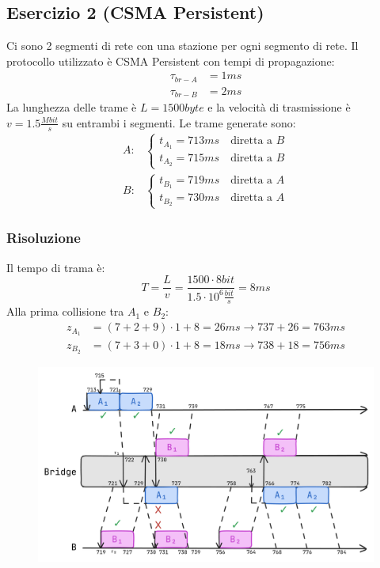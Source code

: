 \documentclass[a4paper]{article}
\begin{document}
\subsection{Esercizio 2 (CSMA Persistent)}
Ci sono 2 segmenti di rete con una stazione per ogni segmento di rete. Il protocollo
utilizzato è CSMA Persistent con tempi di propagazione:
\[
\begin{aligned}
  \tau_{br-A} &= 1ms \\
  \tau_{br-B} &= 2ms
\end{aligned}
\] 
La lunghezza delle trame è \( L = 1500 byte\) e la velocità di trasmissione è
\( v = 1.5 \frac{Mbit}{s} \) su entrambi i segmenti. Le trame generate sono:
\[
\begin{aligned}
  A: & \begin{cases}
    t_{A_1} = 713ms \quad \text{diretta a }B\\
    t_{A_2} = 715ms \quad \text{diretta a }B
  \end{cases}\\
    B: & \begin{cases}
      t_{B_1} = 719ms \quad \text{diretta a }A\\
      t_{B_2} = 730ms \quad \text{diretta a }A
    \end{cases}
\end{aligned}
\] 

\subsubsection{Risoluzione}
Il tempo di trama è:
\[
T = \frac{L}{v} = \frac{1500 \cdot  8bit}{1.5 \cdot  10^6 \frac{bit}{s}} = 8ms
\] 
Alla prima collisione tra \( A_1 \) e \( B_2 \):
\[
\begin{aligned}
  z_{A_1} &= (7+2+9) \cdot 1 + 8 = 26ms \to 737 + 26 = 763ms\\
  z_{B_2} &= (7+3+0) \cdot 1 + 8 = 18ms \to 738 + 18 = 756ms
\end{aligned}
\] 
\begin{figure}[H]
  \centering
  \includegraphics[width=1\textwidth]{../figures/esercitazione-bridge2}
\end{figure}
\end{document}
